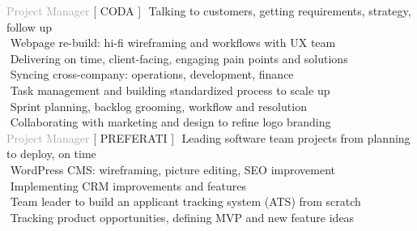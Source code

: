 
    
\begin{cvtable}

{\textcolor{darkgray}{Project Manager}}%
{[ {C\scriptsize ODA} ]}%
{%
    \textperiodcentered $ $ Talking to customers, getting requirements, 
    strategy, follow up \\  %
    \textperiodcentered $ $ Webpage re-build: hi-fi wireframing and workflows with UX team \\
    \textperiodcentered $ $ Delivering on time, client-facing, engaging pain points and solutions \\
     \textperiodcentered $ $ Syncing 
     cross-company: 
     operations, 
     development, 
     finance \\
     \textperiodcentered $ $ Task management and building standardized process to scale up \\
     \textperiodcentered $ $ %
     Sprint planning, backlog grooming, workflow and resolution \\
     \textperiodcentered $ $ Collaborating with 
     marketing and design 
     to refine 
     logo branding  \\
}
% 
% 
{\textcolor{darkgray}{%
Project Manager}}%
{[ {P\scriptsize REFERATI} ]}%
{%
     \textperiodcentered $ $ Leading software team projects from planning to deploy, on time \\
     \textperiodcentered $ $ WordPress CMS: wireframing, picture editing, SEO improvement \\
     \textperiodcentered $ $ Implementing CRM improvements and features \\
     \textperiodcentered $ $ Team leader to build an applicant tracking system (ATS) from scratch\\
     \textperiodcentered $ $ Tracking product opportunities, defining MVP and new feature ideas \\
}
\end{cvtable}
